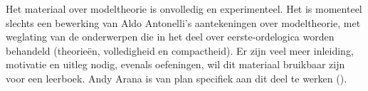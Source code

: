 \documentclass[openany]{memoir}
\begin{document}
\begingroup
\def\olfilename{OLP-0182}
\def\olfilepath{content/model-theory/}
\hypertarget{unit-OLP-0182}{}




\begin{editorial}
  Het materiaal over modeltheorie is onvolledig en experimenteel. Het is
  momenteel slechts een bewerking van Aldo Antonelli's aantekeningen over
  modeltheorie, met weglating van de onderwerpen die in het deel over
  eerste-ordelogica worden behandeld (theorieën, volledigheid en compactheid).
  Er zijn veel meer inleiding, motivatie en uitleg nodig, evenals oefeningen,
  wil dit materiaal bruikbaar zijn voor een leerboek. Andy Arana is van plan
  specifiek aan dit deel te werken ().
\end{editorial}
\endgroup

\begingroup
\def\olfilename{OLP-0183}
\def\olfilepath{content/model-theory/basics/}
\hypertarget{unit-OLP-0183}{}



\endgroup

\begingroup
\def\olfilename{OLP-0184}
\def\olfilepath{content/model-theory/basics/}
\hypertarget{unit-OLP-0184}{}
\end{document}
